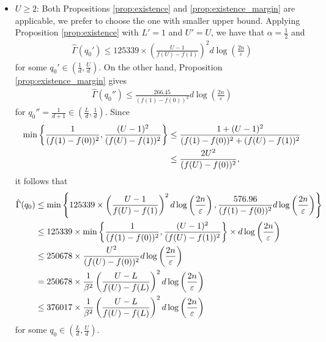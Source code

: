 \documentclass[onecolumn,letterpaper]{IEEEtran}
\newcommand{\cp}{{q}}
\newcommand{\up}{{U}}
\newcommand{\lw}{{L}}
\newcommand{\ap}{{\alpha}}
\newcommand{\bet}{{\beta}}
\newcommand{\exifinal}{{ 376017 \times \frac{1}{\bet^2} \left( \frac{\up-\lw}{f(\up)-f(\lw)} \right)^2  d\log \left( \frac{2n}{\varepsilon } \right)}}
\newcommand{\alp}{{\ap}}
\newcommand{\ftaup}{{\hat{\Gamma}}}
\newcommand{\cpns}{\cp_0}
\newcommand{\fTpns}{\ftaup (\cpns)}
\begin{document}
\begin{itemize}
\item \underline{$\up\geq 2$}: Both Propositions \ref{prop:existence} and  \ref{prop:existence_margin} are applicable, we prefer to choose the one with smaller upper bound. Applying Proposition \ref{prop:existence} with $\lw'=1$ and $\up'=\up$, we have that $\alp=\frac 1 2$ and 
 \begin{align}
    \ftaup(\cpns') \le 125339 \times \left( \frac{\up-1}{f(\up)-f(1)} \right)^2  d\log \left( \frac{2n}{\varepsilon } \right)
\end{align}
for some $\cpns' \in \left(\frac 1 d, \frac \up d\right)$.
On the other hand, Proposition \ref{prop:existence_margin} gives
\begin{align}
    \ftaup(\cpns'') \le \frac{266.45}{(f(1)-f(0))^2} d \log \left( \frac{2n}{\varepsilon} \right)
\end{align}
for $\cpns''=\frac 1 {d+1}\in \left(\frac{\lw}{d},\frac{1}{d}\right)$.
Since
\begin{align}
    \min \left\{ \frac{1}{(f(1)-f(0))^2} , \frac{(\up-1)^2}{(f(\up)-f(1))^2} \right\}
    &\le %
     \frac{1+(\up-1)^2}{(f(1)-f(0))^2 + (f(\up)-f(1))^2} \notag\\
    &\le \frac{2\up^2}{(f(\up)-f(0))^2},
\end{align}
it follows that
\begin{align}
    \fTpns &\le \min \left\{ 125339 \times \left( \frac{\up-1}{f(\up)-f(1)} \right)^2  d\log \left( \frac{2n}{\varepsilon } \right) , \frac{576.96}{(f(1)-f(0))^2} d \log \left( \frac{2n}{\varepsilon} \right) \right\} \notag\\
    &\le 125339 \times \min \left\{ \frac{1}{(f(1)-f(0))^2} , \frac{(\up-1)^2}{(f(\up)-f(1))^2} \right\} \times d\log \left( \frac{2n}{\varepsilon } \right) \notag\\
    &\le 250678 \times \frac{\up^2}{(f(\up)-f(0))^2}  d\log \left( \frac{2n}{\varepsilon } \right) \notag\\
    &= 250678 \times \frac{1}{\bet^2} \left( \frac{\up-\lw}{f(\up)-f(\lw)} \right)^2  d\log \left( \frac{2n}{\varepsilon } \right) \notag\\
    &\le \exifinal
\end{align}
for some $\cpns \in \left( \frac{\lw}{d} , \frac{\up}{d} \right)$.
\end{itemize}
\end{document}

